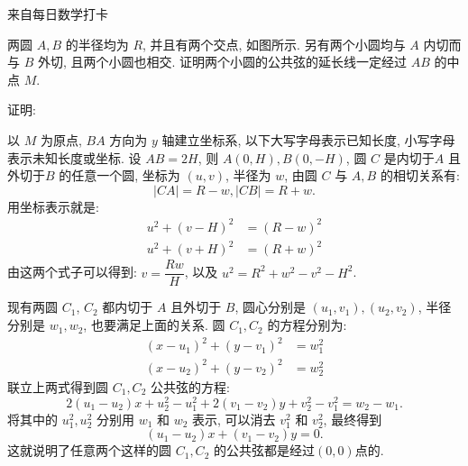 \newpage

\noindent 来自每日数学打卡

两圆 $A,B$ 的半径均为 $R$, 并且有两个交点, 如图所示. 另有两个小圆均与 $A$ 内切而与 $B$ 外切, 且两个小圆也相交. 证明两个小圆的公共弦的延长线一定经过 $AB$ 的中点 $M$.

\begin{figure*}[htbp]
\centering
{}
\end{figure*}

\noindent 证明: 

以 $M$ 为原点, $BA$ 方向为 $y$ 轴建立坐标系, 以下大写字母表示已知长度, 小写字母表示未知长度或坐标. 设 $AB = 2H$, 则 $A(0,H), B(0,-H)$, 圆 $C$ 是内切于$A$ 且外切于$B$ 的任意一个圆, 坐标为 $(u,v)$, 半径为 $w$, 由圆 $C$ 与 $A,B$ 的相切关系有: 
\[ |CA| = R-w, |CB| = R+w. \]
用坐标表示就是:
\begin{align*}
u^2 + (v-H)^2 &= (R-w)^2 \\
u^2 + (v+H)^2 &= (R+w)^2
\end{align*}
由这两个式子可以得到: $v = \dfrac{Rw}{H}$, 以及 $u^2 = R^2+w^2-v^2-H^2$.

现有两圆 $C_1$, $C_2$ 都内切于 $A$ 且外切于 $B$, 圆心分别是 $(u_1,v_1), (u_2,v_2)$, 半径分别是 $w_1, w_2$, 也要满足上面的关系. 圆 $C_1, C_2$ 的方程分别为:
\begin{align*}
(x-u_1)^2 + (y-v_1)^2 &= w_1^2 \\
(x-u_2)^2 + (y-v_2)^2 &= w_2^2 
\end{align*}
联立上两式得到圆 $C_1, C_2$ 公共弦的方程:
\[ 2(u_1-u_2)x + u_2^2-u_1^2 + 2(v_1-v_2)y + v_2^2-v_1^2=w_2-w_1 .\]
将其中的 $u_1^2, u_2^2$ 分别用 $w_1$ 和 $w_2$ 表示, 可以消去 $v_1^2$ 和 $v_2^2$, 最终得到
\[ (u_1-u_2)x+(v_1-v_2)y=0 .\]
这就说明了任意两个这样的圆 $C_1, C_2$ 的公共弦都是经过$(0,0)$点的.

